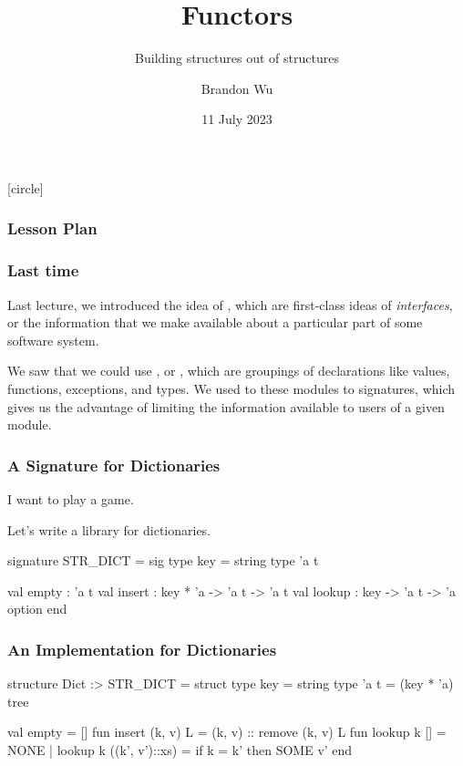 \documentclass[aspectratio=169]{beamer}
\title{Functors} %
\subtitle{Building structures out of structures} %
\date{11 July 2023} %
\author{Brandon Wu} %
\newif\ifcolorlambda
\begin{document}
\ifweb
    \renewcommand{\pause}{}
\fi

[circle]

{
\begin{frame}[plain]
    \colorlambdatrue
    \titlepage
\end{frame}
}

\begin{frame}[fragile]
  \frametitle{Lesson Plan}

  \tableofcontents
\end{frame}

\begin{frame}[fragile]
  \frametitle{Last time}

  Last lecture, we introduced the idea of , which are first-class
  ideas of \textit{interfaces}, or the information that we make available about a
  particular part of some software system.

  We saw that we could use , or , which are groupings
  of declarations like values, functions, exceptions, and types. We used 
   to  these modules to
  signatures, which gives us the advantage of limiting the information available to
  users of a given module.
\end{frame}


\begin{frame}[fragile]
  \frametitle{A Signature for Dictionaries}

  I want to play a game.

  Let's write a library for dictionaries.

  \begin{codeblock}
    signature STR_DICT =
      sig 
        type key = string
        type 'a t

        val empty : 'a t 
        val insert : key * 'a -> 'a t -> 'a t 
        val lookup : key -> 'a t -> 'a option
      end
  \end{codeblock}
\end{frame}


\begin{frame}[fragile]
  \frametitle{An Implementation for Dictionaries}

  \begin{codeblock}
    structure Dict :> STR_DICT =
      struct 
        type key = string
        type 'a t = (key * 'a) tree 

        val empty = []
        fun insert (k, v) L = (k, v) :: remove (k, v) L
        fun lookup k [] = NONE
          | lookup k ((k', v')::xs) =
              if k = k' then SOME v'
      end
  \end{codeblock}
\end{frame}
\end{document}
